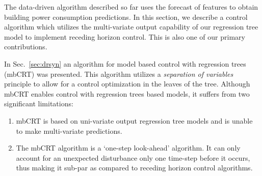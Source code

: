 The data-driven algorithm described so far uses the forecast of features to obtain building power consumption predictions. 
In this section, we describe a control algorithm which utilizes the multi-variate output capability of our regression tree model to implement receding horizon control. This is also one of our primary contributions.

In Sec.~\ref{sec:drsyn} an algorithm for model based control with regression trees (mbCRT) \cite{BehlJainMangharam2016,Behl201630} was presented. This algorithm utilizes a \emph{separation of variables} principle to allow for a control optimization in the leaves of the tree. 
Although mbCRT enables control with regression trees based models, it suffers from two significant limitations:
\begin{enumerate}
\item mbCRT is based on uni-variate output regression tree models and is unable to make multi-variate predictions. 
\item The mbCRT algorithm is a `one-step look-ahead' algorithm. It can only account for an unexpected disturbance only one time-step before it occurs, thus making it sub-par as compared to receding horizon control algorithms.
\end{enumerate}

